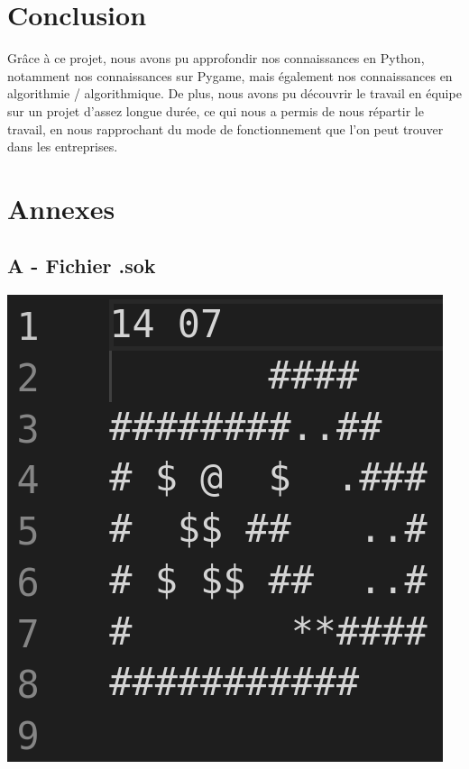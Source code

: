 \documentclass[a4paper,12pt]{article} %
\begin{document}
\section{Conclusion}

Grâce à ce projet, nous avons pu approfondir nos connaissances en Python, notamment nos connaissances sur Pygame, mais également nos connaissances en algorithmie / algorithmique. De plus, nous avons pu découvrir le travail en équipe sur un projet d'assez longue durée, ce qui nous a permis de nous répartir le travail, en nous rapprochant du mode de fonctionnement que l'on peut trouver dans les entreprises.


\newpage
\section{Annexes}

\subsection*{A - Fichier .sok}

\begin{center}
	\includegraphics[scale=0.40]{images/Capture_212000.png}
\end{center}
\end{document}
